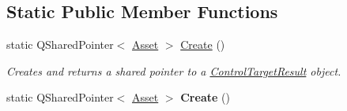 \subsection*{Static Public Member Functions}
\begin{DoxyCompactItemize}
\item 
\hypertarget{class_picto_1_1_control_target_result_a628a1eb95bfa05d89172cfdd0af70e22}{static Q\-Shared\-Pointer$<$ \hyperlink{class_picto_1_1_asset}{Asset} $>$ \hyperlink{class_picto_1_1_control_target_result_a628a1eb95bfa05d89172cfdd0af70e22}{Create} ()}\label{class_picto_1_1_control_target_result_a628a1eb95bfa05d89172cfdd0af70e22}

\begin{DoxyCompactList}\small\item\em Creates and returns a shared pointer to a \hyperlink{class_picto_1_1_control_target_result}{Control\-Target\-Result} object. \end{DoxyCompactList}\item 
\hypertarget{class_picto_1_1_control_target_result_acfa362206df1c3b906c22eceade51c68}{static Q\-Shared\-Pointer$<$ \hyperlink{class_picto_1_1_asset}{Asset} $>$ {\bfseries Create} ()}\label{class_picto_1_1_control_target_result_acfa362206df1c3b906c22eceade51c68}

\end{DoxyCompactItemize}
